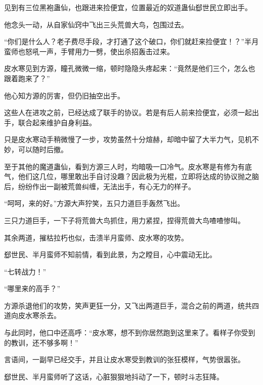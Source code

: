 \begin{this_body}
见到有三位黑袍蛊仙，也跟进来捡便宜，位置最近的奴道蛊仙郄世民立即出手。

他念头一动，从自家仙窍中飞出三头荒兽大鸟，包围过去。

“你们是什么人？老子费尽手段，才打通了这个破口，你们就赶来捡便宜！？”半月蛮师也怒吼一声，手臂用力一劈，使出杀招轰击过来。

皮水寒见到方源，瞳孔微微一缩，顿时隐隐头疼起来：“竟然是他们三个，怎么也跟着跑来了？”

他心知方源的厉害，但仍旧抽空出手。

这些人在进攻之前，已经达成了联手的协议。若是有后人前来捡便宜，必须一起出手，联合起来维护自身利益。

只是皮水寒动手稍微慢了一步，攻势虽然十分煊赫，却暗中留了大半力气，见机不妙，可以随时后撤。

至于其他的魔道蛊仙，看到方源三人时，均暗吸一口冷气。皮水寒是有修为有底气，他们这几位，哪里敢出手自讨没趣？因此极为光棍，立即将达成的协议抛之脑后，纷纷作出一副被荒兽纠缠，无法出手，有心无力的样子。

“呵呵，来的好。”方源大声狞笑，五只力道巨手轰然飞出。

三只力道巨手，一下子将荒兽大鸟抓住，用力紧捏，捏得荒兽大鸟喳喳惨叫。

其余两道，摧枯拉朽也似，击溃半月蛮师、皮水寒的攻势。

郄世民、半月蛮师不知前情，看到此景，为之瞠目，心中震动无比。

“七转战力！”

“哪里来的高手？”

方源杀退他们的攻势，笑声更狂一分，又飞出两道巨手，混合之前的两道，统共四道向皮水寒杀去。

与此同时，他口中还高呼：“皮水寒，想不到你居然跑到这里来了。看样子你受到的教训，还不够多啊！”

言语间，一副早已经交手，并且让皮水寒受到教训的张狂模样，气势很嚣张。

郄世民、半月蛮师听了这话，心脏狠狠地抖动了一下，顿时斗志狂降。

\end{this_body}

